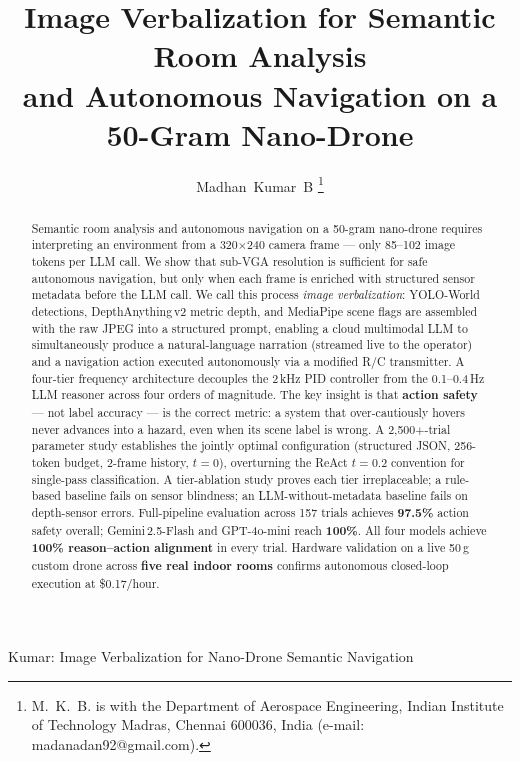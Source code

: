 \documentclass[journal]{IEEEtran}
\begin{document}
\title{Image Verbalization for Semantic Room Analysis\\
and Autonomous Navigation on a 50-Gram Nano-Drone}

\author{Madhan~Kumar~B%
\thanks{M.~K.~B. is with the Department of Aerospace Engineering,
Indian Institute of Technology Madras, Chennai 600036, India
(e-mail: madanadan92@gmail.com).}}

%
{Kumar: Image Verbalization for Nano-Drone Semantic Navigation}

\maketitle

\begin{abstract}
Semantic room analysis and autonomous navigation on a 50-gram
nano-drone requires interpreting an environment from a
320$\times$240 camera frame --- only 85--102 image tokens per
LLM call.
We show that sub-VGA resolution is sufficient for safe autonomous
navigation, but only when each frame is enriched with structured
sensor metadata before the LLM call.
We call this process \emph{image verbalization}: YOLO-World
detections, DepthAnything\,v2 metric depth, and MediaPipe scene
flags are assembled with the raw JPEG into a structured prompt,
enabling a cloud multimodal LLM to simultaneously produce a
natural-language narration (streamed live to the operator) and a
navigation action executed autonomously via a modified R/C
transmitter.
A four-tier frequency architecture decouples the 2\,kHz PID
controller from the 0.1--0.4\,Hz LLM reasoner across four orders
of magnitude.
The key insight is that \textbf{action safety} --- not label
accuracy --- is the correct metric: a system that over-cautiously
hovers never advances into a hazard, even when its scene label is
wrong.
A 2,500$+$-trial parameter study establishes the jointly optimal
configuration (structured JSON, 256-token budget, 2-frame history,
$t=0$), overturning the ReAct $t=0.2$ convention for single-pass
classification.
A tier-ablation study proves each tier irreplaceable; a rule-based
baseline fails on sensor blindness; an LLM-without-metadata
baseline fails on depth-sensor errors.
Full-pipeline evaluation across 157 trials achieves
\textbf{97.5\%} action safety overall; Gemini\,2.5-Flash and
GPT-4o-mini reach \textbf{100\%}.
All four models achieve \textbf{100\% reason--action alignment}
in every trial.
Hardware validation on a live 50\,g custom drone across
\textbf{five real indoor rooms} confirms autonomous closed-loop
execution at \$0.17/hour.
\end{abstract}
\end{document}
